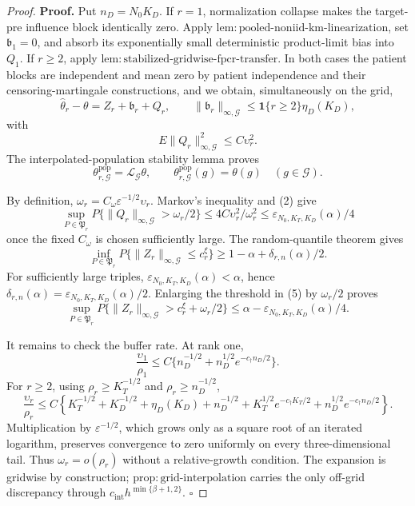 \documentclass{article}
\begin{document}
\begin{proof}
\textbf{Proof.}
Put \(n_D=N_0K_D\).  If \(r=1\), normalization collapse makes the target-pre influence block identically zero.  Apply \(\mathrm{lem:pooled\mbox{-}noniid\mbox{-}km\mbox{-}linearization}\), set \(\mathfrak b_1=0\), and absorb its exponentially small deterministic product-limit bias into \(Q_1\).  If \(r\ge2\), apply \(\mathrm{lem:stabilized\mbox{-}gridwise\mbox{-}fpcr\mbox{-}transfer}\).  In both cases the patient blocks are independent and mean zero by patient independence and their censoring-martingale constructions, and we obtain, simultaneously on the grid,
\[
 \widehat\theta_r-\theta=Z_r+\mathfrak b_r+Q_r,
 \qquad
 \|\mathfrak b_r\|_{\infty,\mathcal G}
 \le\mathbf1\{r\ge2\}\eta_D(K_D),                     \tag{1}
\]
with
\[
 E\|Q_r\|_{\infty,\mathcal G}^2\le C\upsilon_r^2.      \tag{2}
\]
The interpolated-population stability lemma proves
\[
 \theta^{\mathrm{pop}}_{r,\mathcal G}
 =\mathcal L_{\mathcal G}\theta,
 \qquad
 \theta^{\mathrm{pop}}_{r,\mathcal G}(g)=\theta(g)
 \quad(g\in\mathcal G).                                \tag{3}
\]

By definition, \(\omega_r=C_\omega\varepsilon^{-1/2}\upsilon_r\).  Markov's inequality and (2) give
\[
 \sup_{P\in\mathfrak P_r}P\{\|Q_r\|_{\infty,\mathcal G}>\omega_r/2\}
 \le4C\upsilon_r^2/\omega_r^2
 \le\varepsilon_{N_0,K_T,K_D}(\alpha)/4                \tag{4}
\]
once the fixed \(C_\omega\) is chosen sufficiently large.  The random-quantile theorem gives
\[
 \inf_{P\in\mathfrak P_r}P\{\|Z_r\|_{\infty,\mathcal G}\le c_r^\xi\}
 \ge1-\alpha+\delta_{r,n}(\alpha)/2.                   \tag{5}
\]
For sufficiently large triples, \(\varepsilon_{N_0,K_T,K_D}(\alpha)<\alpha\), hence \(\delta_{r,n}(\alpha)=\varepsilon_{N_0,K_T,K_D}(\alpha)/2\).  Enlarging the threshold in (5) by \(\omega_r/2\) proves
\[
 \sup_{P\in\mathfrak P_r}P\{\|Z_r\|_{\infty,\mathcal G}>c_r^\xi+\omega_r/2\}
 \le\alpha-\varepsilon_{N_0,K_T,K_D}(\alpha)/4.         \tag{6}
\]

It remains to check the buffer rate.  At rank one,
\[
 \frac{\upsilon_1}{\rho_1}
 \le C\{n_D^{-1/2}+n_D^{1/2}e^{-c_\dagger n_D/2}\}.   \tag{7}
\]
For \(r\ge2\), using \(\rho_r\ge K_T^{-1/2}\) and \(\rho_r\ge n_D^{-1/2}\),
\[
 \frac{\upsilon_r}{\rho_r}
 \le C\left\{K_T^{-1/2}+K_D^{-1/2}+\eta_D(K_D)
 +n_D^{-1/2}+K_T^{1/2}e^{-c_\dagger K_T/2}
 +n_D^{1/2}e^{-c_\dagger n_D/2}\right\}.               \tag{8}
\]
Multiplication by \(\varepsilon^{-1/2}\), which grows only as a square root of an iterated logarithm, preserves convergence to zero uniformly on every three-dimensional tail.  Thus \(\omega_r=o(\rho_r)\) without a relative-growth condition.  The expansion is gridwise by construction; \(\mathrm{prop:grid\mbox{-}interpolation}\) carries the only off-grid discrepancy through \(c_{\mathrm{int}}h^{\min\{\beta+1,2\}}\). \(\square\)
\end{proof}
\end{document}
